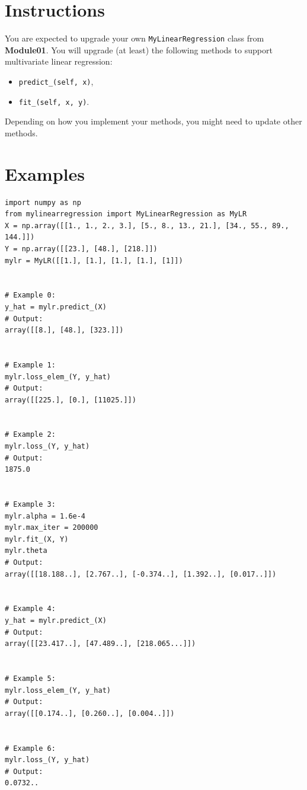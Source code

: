 \documentclass{42-en}
\begin{document}
\section*{Instructions}
You are expected to upgrade your own \texttt{MyLinearRegression} class from \textbf{Module01}.
You will upgrade (at least) the following methods to support multivariate linear regression:
\begin{itemize}
  \item \texttt{predict\_(self, x)}, 
  \item \texttt{fit\_(self, x, y)}.
\end{itemize}
Depending on how you implement your methods, you might need to update other methods.

\section*{Examples}
\begin{verbatim}
import numpy as np
from mylinearregression import MyLinearRegression as MyLR
X = np.array([[1., 1., 2., 3.], [5., 8., 13., 21.], [34., 55., 89., 144.]])
Y = np.array([[23.], [48.], [218.]])
mylr = MyLR([[1.], [1.], [1.], [1.], [1]])


# Example 0:
y_hat = mylr.predict_(X)
# Output:
array([[8.], [48.], [323.]])


# Example 1:
mylr.loss_elem_(Y, y_hat)
# Output:
array([[225.], [0.], [11025.]])


# Example 2:
mylr.loss_(Y, y_hat)
# Output:
1875.0


# Example 3:
mylr.alpha = 1.6e-4
mylr.max_iter = 200000
mylr.fit_(X, Y)
mylr.theta
# Output:
array([[18.188..], [2.767..], [-0.374..], [1.392..], [0.017..]])


# Example 4:
y_hat = mylr.predict_(X)
# Output:
array([[23.417..], [47.489..], [218.065...]])


# Example 5:
mylr.loss_elem_(Y, y_hat)
# Output:
array([[0.174..], [0.260..], [0.004..]])


# Example 6:
mylr.loss_(Y, y_hat)
# Output:
0.0732..
\end{verbatim}


\newpage
\end{document}

